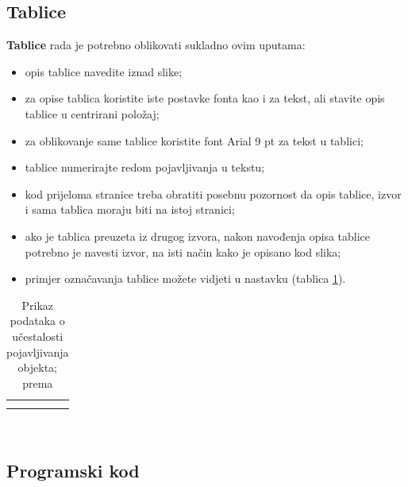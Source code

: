 \documentclass[]{foi}
\begin{document}
\subsection{Tablice}

\textbf{Tablice} rada je potrebno oblikovati sukladno ovim uputama:
\begin{itemize}
	\item opis tablice navedite iznad slike;

	\item za opise tablica koristite iste postavke fonta kao i za tekst, ali stavite opis tablice u centrirani položaj;

	\item za oblikovanje same tablice koristite font Arial 9 pt za tekst u tablici;

	\item tablice numerirajte redom pojavljivanja u tekstu;

	\item kod prijeloma stranice treba obratiti posebnu pozornost da opis tablice, izvor i sama tablica moraju biti na istoj stranici;

	\item ako je tablica preuzeta iz drugog izvora, nakon navođenja opisa tablice potrebno je navesti izvor, na isti način kako je opisano kod slika;

	\item primjer označavanja tablice možete vidjeti u nastavku (tablica \ref{tab:objekti}).
\end{itemize}

\begin{table}[h!]
	\centering
	\caption{Prikaz podataka o učestalosti pojavljivanja objekta; prema \cite{wooldridge2009IntroductionMultiAgentSystems}}
	\begin{tabularx}{0.66\textwidth}{|X|X|X|X|}
		\hline
		\cellcolor{gray!25} & \cellcolor{gray!25} & \cellcolor{gray!25} & \cellcolor{gray!25} \\
		\hline
		                    &                     &                     &                     \\
		\hline
		                    &                     &                     &                     \\
		\hline
	\end{tabularx}
	\\[10pt]
	\label{tab:objekti}
\end{table}

\subsection{Programski kod}
\end{document}
